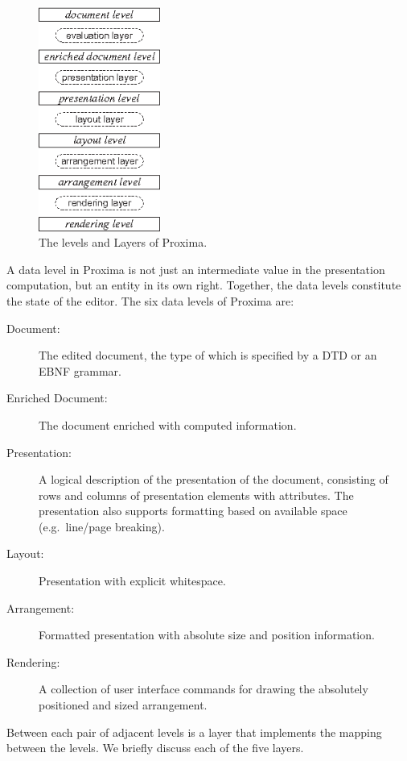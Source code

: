 \documentclass[12pt]{article}
\begin{document}
\begin{figure}[ht]
\centering
\includegraphics[width=4cm]{images/LevelLayerNames}
\caption{The levels and Layers of Proxima.}
\label{fig:levelsAndLayers}
\end{figure}

A data level in Proxima is not just an intermediate value in the presentation computation, but an entity in its own right. Together, the data levels constitute the state of the editor. The six data levels of Proxima are:


\begin{description}
\item[Document:] The edited document, the type of which is specified by a DTD or an EBNF grammar.

\item[Enriched Document:] The document enriched with computed information.

\item[Presentation:] A logical description of the presentation of the document, consisting of rows and columns of presentation elements with attributes. The presentation also supports formatting based on available space (e.g.\ line/page breaking).

\item[Layout:]  Presentation with explicit whitespace.

\item[Arrangement:] Formatted presentation with absolute size and position information.

\item[Rendering:] A collection of user interface commands for drawing the absolutely positioned and sized arrangement.
\end{description}

Between each pair of adjacent levels is a layer that implements the mapping between the levels. We briefly discuss each of the five layers.
\end{document}
